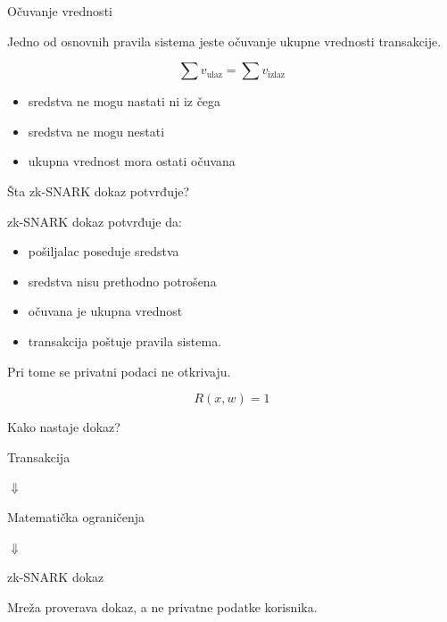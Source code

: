 \documentclass[aspectratio=1610]{beamer}
\begin{document}
\begin{frame}{Očuvanje vrednosti}

Jedno od osnovnih pravila sistema jeste očuvanje ukupne vrednosti transakcije.

\[
\sum v_{\text{ulaz}}=\sum v_{\text{izlaz}}
\]

\bigskip

\begin{itemize}
    \item sredstva ne mogu nastati ni iz čega
    \item sredstva ne mogu nestati
    \item ukupna vrednost mora ostati očuvana
\end{itemize}

\end{frame}

\begin{frame}{Šta zk-SNARK dokaz potvrđuje?}

zk-SNARK dokaz potvrđuje da:

\begin{itemize}
    \item pošiljalac poseduje sredstva
    \item sredstva nisu prethodno potrošena
    \item očuvana je ukupna vrednost
    \item transakcija poštuje pravila sistema.
\end{itemize}

\bigskip

Pri tome se privatni podaci ne otkrivaju.

\[
R(x,w)=1
\]

\end{frame}

\begin{frame}{Kako nastaje dokaz?}

\begin{center}

Transakcija

\vspace{0.3cm}

\(\Downarrow\)

\vspace{0.3cm}

Matematička ograničenja

\vspace{0.3cm}

\(\Downarrow\)

\vspace{0.3cm}

zk-SNARK dokaz

\end{center}

\bigskip

Mreža proverava dokaz, a ne privatne podatke korisnika.
\end{frame}
\end{document}
